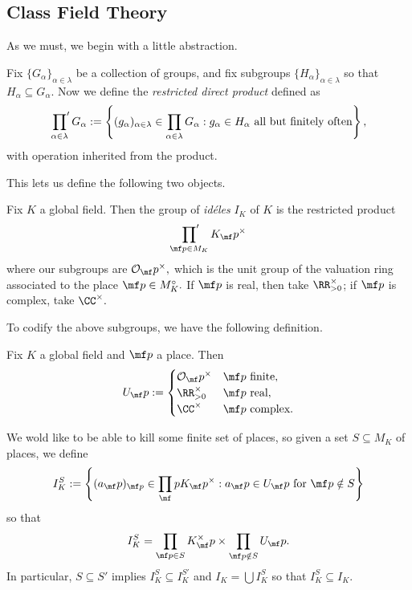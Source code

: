 \documentclass[../notes.tex]{subfiles}
\begin{document}
\subsection{Class Field Theory}
As we must, we begin with a little abstraction.
\begin{definition}
	Fix $\{G_\alpha\}_{\alpha\in\lambda}$ be a collection of groups, and fix subgroups $\{H_\alpha\}_{\alpha\in\lambda}$ so that $H_\alpha\subseteq G_\alpha.$ Now we define the \textit{restricted direct product} defined as
	\[\sideset{}{'}\prod_{\alpha\in\lambda}G_\alpha:=\left\{(g_\alpha)_{\alpha\in\lambda}\in\prod_{\alpha\in\lambda}G_\alpha:g_\alpha\in H_\alpha\text{ all but finitely often}\right\},\]
	with operation inherited from the product.
\end{definition}
This lets us define the following two objects.
\begin{definition}[Id\'eles]
	Fix $K$ a global field. Then the group of \textit{id\'{e{l}es}} $I_K$ of $K$ is the restricted product
	\[\sideset{}{'}\prod_{\mf p\in M_K}K_\mf p^\times\]
	where our subgroups are $\mathcal O_\mf p^\times,$ which is the unit group of the valuation ring associated to the place $\mf p\in M_K^\circ.$ If $\mf p$ is real, then take $\RR^\times_{>0}$; if $\mf p$ is complex, take $\CC^\times.$
\end{definition}
To codify the above subgroups, we have the following definition.
\begin{definition}
	Fix $K$ a global field and $\mf p$ a place. Then
	\[U_\mf p:=\begin{cases}
		\mathcal O_\mf p^\times & \mf p\text{ finite}, \\
		\RR^\times_{>0} & \mf p\text{ real}, \\
		\CC^\times & \mf p\text{ complex}.
	\end{cases}\]
\end{definition}
We wold like to be able to kill some finite set of places, so given a set $S\subseteq M_K$ of places, we define
\[I^S_K:=\left\{(a_\mf p)_{\mf p}\in\prod_\mf p K_\mf p^\times:a_\mf p\in U_\mf p\text{ for }\mf p\notin S\right\}\]
so that
\[I^S_K=\prod_{\mf p\in S}K^\times_\mf p\times\prod_{\mf p\notin S}U_\mf p.\]
In particular, $S\subseteq S'$ implies $I^S_K\subseteq I^{S'}_K$ and $I_K=\bigcup I^S_K$ so that $I^S_K\subseteq I_K.$
\end{document}
